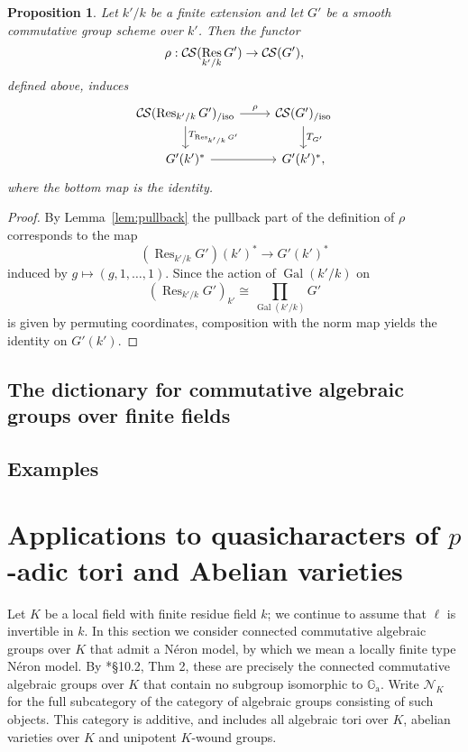 \documentclass[10pt]{amsart}
\theoremstyle{plain}
\newtheorem{proposition}[theorem]{Proposition}
\theoremstyle{definition}
\theoremstyle{remark}
\newcommand{\Fq}{k}
\DeclareMathOperator{\Gal}{Gal}
\DeclareMathOperator{\Res}{Res}
\newcommand{\TrFrob}[1]{T_{#1}}
\newcommand{\CS}{{\mathcal{C\hskip-0.8pt S}}}
\newcommand{\CSiso}[1]{\CS(#1)_{/\text{iso}}}
\begin{document}
\begin{proposition}
Let $k'/k$ be a finite extension and let $G'$ be a smooth commutative group scheme over $k'$.
Then the functor 
\[
\rho : \CS(\Res_{k'/k}G') \to \CS(G'),
\]
defined above, induces
\[
\begin{tikzcd}
\CSiso{\Res_{k'/k} G'} \dar{\TrFrob{\Res_{k'/k} G'}} \rar{\rho} & \CSiso{G'} \dar{\TrFrob{G'}}\\
G'(k')^* \rar & G'(k')^*,
\end{tikzcd}
\]
where the bottom map is the identity.
\end{proposition}
\begin{proof}
By Lemma~\ref{lem:pullback} the pullback part of the definition of $\rho$ corresponds to the map
\[
(\Res_{k'/k}G')(k')^* \to G'(k')^*
\]
induced by $g \mapsto (g, 1, \ldots, 1)$.  Since the action of $\Gal(k'/k)$ on
\[
(\Res_{k'/k}G')_{k'} \cong \prod_{\Gal(k'/k)} G'
\]
is given by permuting coordinates, composition with the norm map yields the identity on $G'(k')$.
\end{proof}

\subsection{The dictionary for commutative algebraic groups over finite fields}


\subsection{Examples}


\section{Applications to quasicharacters of $p$-adic tori and Abelian varieties}\label{sec:applications}

Let $K$ be a local field with finite residue field $\Fq$;
 we continue to assume that $\ell$ is invertible in $\Fq$.
In this section we consider connected commutative algebraic groups over $K$ that admit a N\'eron model, by which we mean a locally finite type N\'eron model.
By \cite{bosch-lutkebohmert-reynaud:NeronModels}*{\S 10.2, Thm 2}, these are precisely the connected commutative algebraic groups over $K$ that contain no subgroup isomorphic to $\mathbb{G}_\text{a}$.
Write $\mathcal{N}_K$ for the full subcategory of the category of algebraic groups consisting of such objects.  This category is additive, and includes all algebraic tori over $K$, abelian varieties over $K$ and unipotent $K$-wound groups.
\end{document}
